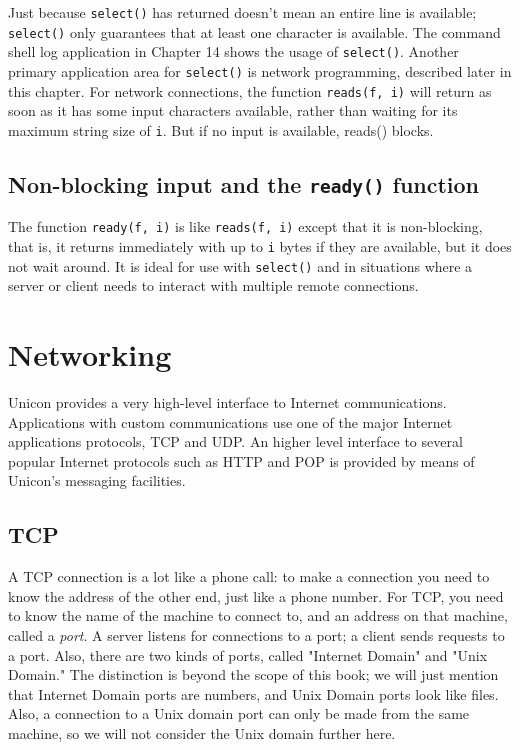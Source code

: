 
Just because \texttt{select()} has returned doesn't
mean an entire line is available; \texttt{select()} only guarantees
that at least one character is available. The command shell log
application in Chapter 14 shows the usage of \texttt{select()}. Another
primary application area for \texttt{select()} is network programming,
described later in this chapter. For network connections, the function
\texttt{reads(f, i)} will return as soon as it has some input
characters available, rather than waiting for its maximum string size
of \texttt{i}. But if no input is available, reads() blocks.

\subsection*{Non-blocking input and the \texttt{ready()} function}

The function \texttt{ready(f, i)} is like \texttt{reads(f, i)} except
that it is non-blocking, that is, it returns immediately with up to
\texttt{i} bytes if they are available, but it does not wait around. It
is ideal for use with \texttt{select()} and in situations where a
server or client needs to interact with multiple remote connections.

\section[Networking]{Networking}
Unicon provides a very high-level interface to
Internet communications. Applications with custom
communications use one of the major Internet
applications protocols, TCP and UDP. An higher level
interface to several popular Internet protocols such as HTTP and POP is
provided by means of Unicon's messaging facilities.

\subsection*{TCP}

A TCP connection is a lot like a phone call: to make a connection you
need to know the address of the other end, just like a phone number.
For TCP, you need to know the name of the machine to connect to, and an
address on that machine, called a \textit{port}. A server listens for
connections to a port; a client sends requests to a port. Also, there
are two kinds of ports, called "Internet
Domain" and "Unix Domain."
The distinction is beyond the scope of this book; we will just mention
that Internet Domain ports are numbers, and Unix Domain ports look like
files. Also, a connection to a Unix domain port can only be made from
the same machine, so we will not consider the Unix domain further here.

